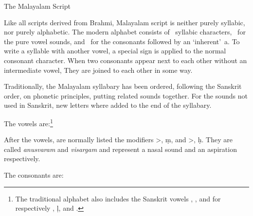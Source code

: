 \beginsection The Malayalam Script

Like all scripts derived from Brahmi, Malayalam script is neither
purely syllabic, nor purely alphabetic. The modern alphabet consists
of {}~syllabic characters, {}~for the pure vowel sounds, and
{}~for the consonants followed by an `inherent'~{\mmtr a}. To write a
syllable with another vowel, a special sign is applied to the normal
consonant character. When two consonants appear next to each other
without an intermediate vowel, They are joined to each other in some
way.

Traditionally, the Malayalam syllabary has been ordered, following the
Sanskrit order, on phonetic principles, putting related sounds
together. For the sounds not used in Sanskrit, new letters where added
to the end of the syllabary.

\noindent The vowels are:\footnote*{The traditional alphabet also
includes the Sanskrit vowels {\mm {}}, {\mm {}}, and {\mm {}} for respectively
{\mmtr {\rii}}, {\mmtr \d l}, and {\mmtr {\lii}}.}

\bigskip
\centerline{\vbox{\twelvemmc{}}}
\bigskip

\noindent After the vowels, are normally listed the modifiers {\mm {}>},
{\mmtr \d m}, and {\mm {}>}, {\mmtr \d h}. They are called {\it anusvaram} and {\it
visargam} and represent a nasal sound and an aspiration respectively.

The consonants are:

